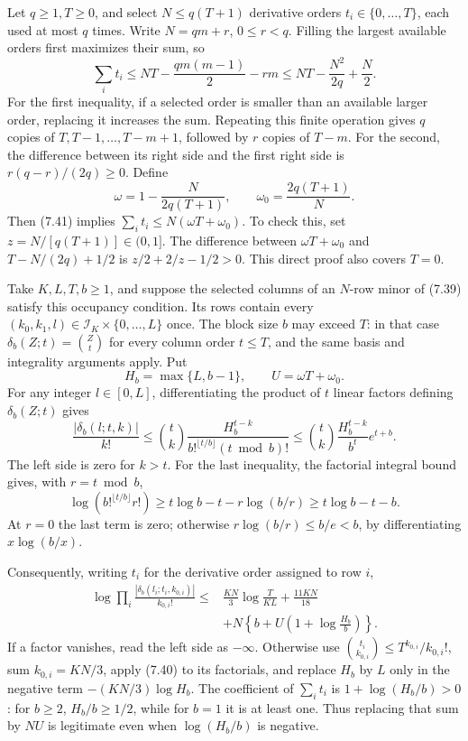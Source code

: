 \documentclass[
  11pt,
  a4paper,
]{article}
\begin{document}
Let \(q\ge1,T\ge0\), and select \(N\le q(T+1)\) derivative orders
\(t_i\in\{0,\ldots,T\}\), each used at most \(q\) times. Write
\(N=qm+r\), \(0\le r<q\). Filling the largest available orders first
maximizes their sum, so \[
\sum_i t_i\le NT-\frac{qm(m-1)}2-rm
\le NT-\frac{N^2}{2q}+\frac N2. \tag{7.41}
\] For the first inequality, if a selected order is smaller than an
available larger order, replacing it increases the sum. Repeating this
finite operation gives \(q\) copies of \(T,T-1,\ldots,T-m+1\), followed
by \(r\) copies of \(T-m\). For the second, the difference between its
right side and the first right side is \(r(q-r)/(2q)\ge0\). Define \[
\omega=1-\frac{N}{2q(T+1)},\qquad
\omega_0=\frac{2q(T+1)}N.
\] Then (7.41) implies \(\sum_i t_i\le N(\omega T+\omega_0)\). To check
this, set \(z=N/[q(T+1)]\in(0,1]\). The difference between
\(\omega T+\omega_0\) and \(T-N/(2q)+1/2\) is \(z/2+2/z-1/2>0\). This
direct proof also covers \(T=0\).

Take \(K,L,T,b\ge1\), and suppose the selected columns of an \(N\)-row
minor of (7.39) satisfy this occupancy condition. Its rows contain every
\((k_0,k_1,l)\in\mathcal I_K\times\{0,\ldots,L\}\) once. The block size
\(b\) may exceed \(T\): in that case \(\delta_b(Z;t)=\binom Zt\) for
every column order \(t\le T\), and the same basis and integrality
arguments apply. Put \[
H_b=\max\{L,b-1\},\qquad U=\omega T+\omega_0.
\] For any integer \(l\in[0,L]\), differentiating the product of \(t\)
linear factors defining \(\delta_b(Z;t)\) gives \[
\frac{|\delta_b(l;t,k)|}{k!}
\le\binom tk\frac{H_b^{t-k}}{b!^{\lfloor t/b\rfloor}(t\bmod b)!}
\le\binom tk\frac{H_b^{t-k}}{b^t}e^{t+b}.
\] The left side is zero for \(k>t\). For the last inequality, the
factorial integral bound gives, with \(r=t\bmod b\), \[
\log(b!^{\lfloor t/b\rfloor}r!)
\ge t\log b-t-r\log(b/r)\ge t\log b-t-b.
\] At \(r=0\) the last term is zero; otherwise \(r\log(b/r)\le b/e<b\),
by differentiating \(x\log(b/x)\).

Consequently, writing \(t_i\) for the derivative order assigned to row
\(i\), \[
\begin{aligned}
\log\prod_i\frac{|\delta_b(l_i;t_i,k_{0,i})|}{k_{0,i}!}
\le{}&\frac{KN}{3}\log\frac{T}{KL}+\frac{11KN}{18}\\
&+N\left\{b+U\left(1+\log\frac{H_b}{b}\right)\right\}.
\end{aligned} \tag{7.42}
\] If a factor vanishes, read the left side as \(-\infty\). Otherwise
use \(\binom{t_i}{k_{0,i}}\le T^{k_{0,i}}/k_{0,i}!\), sum
\(k_{0,i}=KN/3\), apply (7.40) to its factorials, and replace \(H_b\) by
\(L\) only in the negative term \(-(KN/3)\log H_b\). The coefficient of
\(\sum_i t_i\) is \(1+\log(H_b/b)>0\): for \(b\ge2\), \(H_b/b\ge1/2\),
while for \(b=1\) it is at least one. Thus replacing that sum by \(NU\)
is legitimate even when \(\log(H_b/b)\) is negative.
\end{document}
